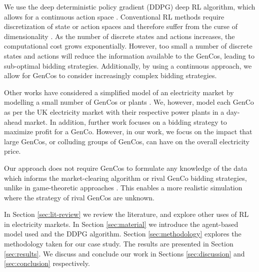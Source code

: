 \documentclass[conference]{IEEEtran}
\begin{document}
We use the deep deterministic policy gradient (DDPG) deep RL algorithm, which allows for a continuous action space \cite{Hunt2016a}. Conventional RL methods require discretization of state or action spaces and therefore suffer from the curse of dimensionality \cite{Ye2020a}. As the number of discrete states and actions increases, the computational cost grows exponentially. However, too small a number of discrete states and actions will reduce the information available to the GenCos, leading to sub-optimal bidding strategies. Additionally, by using a continuous approach, we allow for GenCos to consider increasingly complex bidding strategies. 

Other works have considered a simplified model of an electricity market by modelling a small number of GenCos or plants \cite{EsmaeiliAliabadi2017,Tellidou2007}. We, however, model each GenCo as per the UK electricity market with their respective power plants in a day-ahead market. In addition, further work focuses on a bidding strategy to maximize profit for a GenCo. However, in our work, we focus on the impact that large GenCos, or colluding groups of GenCos, can have on the overall electricity price.


Our approach does not require GenCos to formulate any knowledge of the data which informs the market-clearing algorithm or rival GenCo bidding strategies, unlike in game-theoretic approaches \cite{Wang2011}. This enables a more realistic simulation where the strategy of rival GenCos are unknown.

In Section \ref{sec:lit-review} we review the literature, and explore other uses of RL in electricity markets. In Section \ref{sec:material} we introduce the agent-based model used and the DDPG algorithm. Section \ref{sec:methodology} explores the methodology taken for our case study. The results are presented in Section \ref{sec:results}. We discuss and conclude our work in Sections \ref{sec:discussion} and \ref{sec:conclusion} respectively. 









\end{document}
